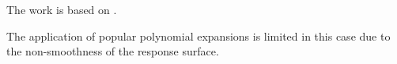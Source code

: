 The work is based on \cite{ma2009}.

The application of popular polynomial expansions is limited in this case due to
the non-smoothness of the response surface.
